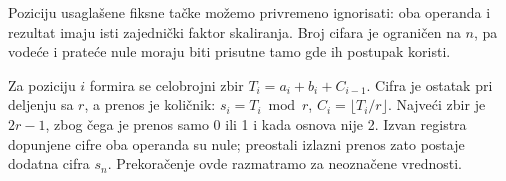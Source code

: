 Poziciju usaglašene fiksne tačke možemo privremeno ignorisati: oba operanda i rezultat imaju isti zajednički faktor skaliranja. Broj cifara je ograničen na $n$, pa vodeće i prateće nule moraju biti prisutne tamo gde ih postupak koristi.

Za poziciju $i$ formira se celobrojni zbir $T_i=a_i+b_i+C_{i-1}$. Cifra je ostatak pri deljenju sa $r$, a prenos je količnik: $s_i=T_i\bmod r$, $C_i=\lfloor T_i/r\rfloor$. Najveći zbir je $2r-1$, zbog čega je prenos samo 0 ili 1 i kada osnova nije 2. Izvan registra dopunjene cifre oba operanda su nule; preostali izlazni prenos zato postaje dodatna cifra $s_n$. Prekoračenje ovde razmatramo za neoznačene vrednosti.
